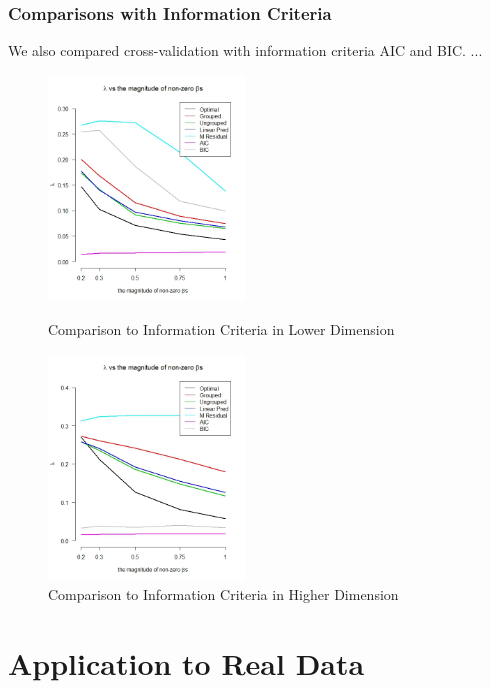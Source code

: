 \documentclass{article}\usepackage[]{graphicx}\usepackage[]{color}
\begin{document}
  
  \vspace{20 mm}
    \subsubsection {Comparisons with Information Criteria}
    We also compared cross-validation with information criteria AIC and BIC. ...
    
   \begin{figure}[h]
    \centering
    \begin{minipage}[b]{0.4\textwidth}
      \centering
		  \includegraphics[height= 6cm ]{./figures/aic_01.jpeg}
      \caption{Comparison to Information Criteria in Lower Dimension}
     \end{minipage}
     \begin{minipage}[b]{0.4\textwidth}
      \centering
		  \includegraphics[height= 6cm ]{./figures/aic_02.jpeg}
      \caption{Comparison to Information Criteria in Higher Dimension}
      \end{minipage}	
   \end{figure}	
    
    
    
\section{Application to Real Data}
\end{document}
